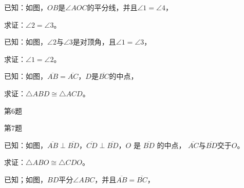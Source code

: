 \begin{Exercise}
\begin{question}
\item 已知：如图，$OB$是$\angle AOC$的平分线，并且$\angle 1=\angle 4$，

求证：$\angle 2=\angle 3$。
\item 已知：如图，$\angle 2$与$\angle 3$是对顶角，且$\angle 1=\angle 3$，

求证：$\angle 1=\angle 2$。
\item 已知：如图，$\overline{AB}=\overline{AC}$，$D$是$\overline{BC}$的中点，

求证：$\triangle ABD\cong \triangle ACD$。
\begin{figurehere}
    \begin{minipage}[b]{0.48\linewidth}
    \centering
\begin{tikzpicture}[>=latex, scale=1]

    \end{tikzpicture}
    \caption*{第6题}
    \end{minipage}
    \begin{minipage}[b]{0.48\linewidth}
    \centering
    \caption*{第7题}
    \end{minipage}
    \end{figurehere}

\item 已知：如图，$\overline{AB}\perp \overline{BD}$，$\overline{CD}\perp \overline{BD}$，$O$ 是 $\overline{BD}$ 的中点，
$\overline{AC}$与$\overline{BD}$交于$O$。

求证：$\triangle ABO\cong \triangle CDO$。
\item 已知；如图，$BD$平分$\angle ABC$，并且$\overline{AB}=\overline{BC}$，


\end{question}
\end{Exercise}
